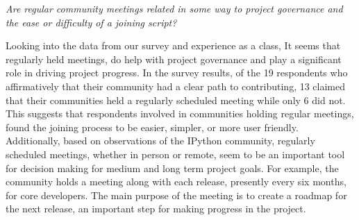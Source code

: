 {\it Are regular community meetings related in some way to project governance and the ease or difficulty of a joining script?}

Looking into the data from our survey and experience as a class, It seems that regularly held meetings, do help with project governance and play a significant role in driving project progress. In the survey results, of the 19 respondents who affirmatively that their community had a clear path to contributing, 13 claimed that their communities held a regularly scheduled meeting while only 6 did not. This suggests that respondents involved in communities holding regular meetings, found the joining process to be easier, simpler, or more user friendly. Additionally, based on observations of the IPython community, regularly scheduled meetings, whether in person or remote, seem to be an important tool for decision making for medium and long term project goals. For example, the community holds a meeting along with each release, presently every six months, for core developers. The main purpose of the meeting is to create a roadmap for the next release, an important step for making progress in the project.
